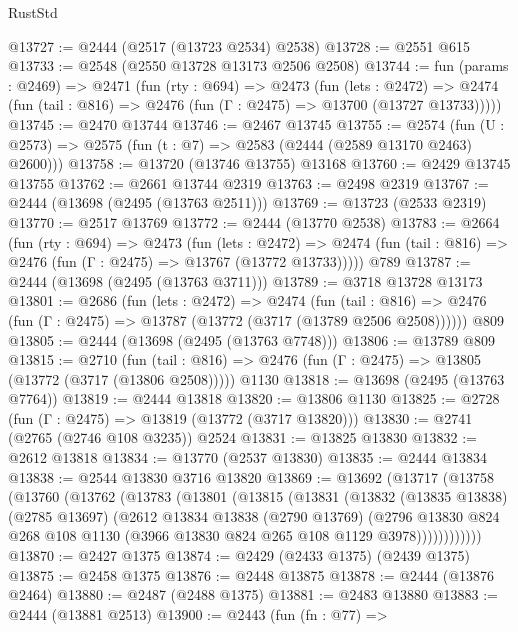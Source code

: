 \begin{lexlean}{RustStd}
\begin{coremodule}
@13727 := @2444 (@2517 (@13723 @2534) @2538)
@13728 := @2551 @615
@13733 := @2548 (@2550 @13728 @13173 @2506 @2508)
@13744 := fun (params : @2469) =>
  @2471
    (fun (rty : @694) =>
    @2473
      (fun (lets : @2472) =>
      @2474 (fun (tail : @816) => @2476 (fun (Γ : @2475) => @13700 (@13727 @13733)))))
@13745 := @2470 @13744
@13746 := @2467 @13745
@13755 := @2574
    (fun (U : @2573) => @2575 (fun (t : @7) => @2583 (@2444 (@2589 @13170 @2463) @2600)))
@13758 := @13720 (@13746 @13755) @13168
@13760 := @2429 @13745 @13755
@13762 := @2661 @13744 @2319
@13763 := @2498 @2319
@13767 := @2444 (@13698 (@2495 (@13763 @2511)))
@13769 := @13723 (@2533 @2319)
@13770 := @2517 @13769
@13772 := @2444 (@13770 @2538)
@13783 := @2664
    (fun (rty : @694) =>
    @2473
      (fun (lets : @2472) =>
      @2474 (fun (tail : @816) => @2476 (fun (Γ : @2475) => @13767 (@13772 @13733)))))
    @789
@13787 := @2444 (@13698 (@2495 (@13763 @3711)))
@13789 := @3718 @13728 @13173
@13801 := @2686
    (fun (lets : @2472) =>
    @2474
      (fun (tail : @816) =>
      @2476 (fun (Γ : @2475) => @13787 (@13772 (@3717 (@13789 @2506 @2508))))))
    @809
@13805 := @2444 (@13698 (@2495 (@13763 @7748)))
@13806 := @13789 @809
@13815 := @2710
    (fun (tail : @816) => @2476 (fun (Γ : @2475) => @13805 (@13772 (@3717 (@13806 @2508)))))
    @1130
@13818 := @13698 (@2495 (@13763 @7764))
@13819 := @2444 @13818
@13820 := @13806 @1130
@13825 := @2728 (fun (Γ : @2475) => @13819 (@13772 (@3717 @13820)))
@13830 := @2741 (@2765 (@2746 @108 @3235)) @2524
@13831 := @13825 @13830
@13832 := @2612 @13818
@13834 := @13770 (@2537 @13830)
@13835 := @2444 @13834
@13838 := @2544 @13830 @3716 @13820
@13869 := @13692
    (@13717
      (@13758
        (@13760
          (@13762
            (@13783
              (@13801
                (@13815
                  (@13831
                    (@13832
                      (@13835 @13838)
                      (@2785 @13697)
                      (@2612
                        @13834
                        @13838
                        (@2790 @13769)
                        (@2796
                          @13830
                          @824
                          @268
                          @108
                          @1130
                          (@3966 @13830 @824 @265 @108 @1129 @3978))))))))))))
@13870 := @2427 @1375
@13874 := @2429 (@2433 @1375) (@2439 @1375)
@13875 := @2458 @1375
@13876 := @2448 @13875
@13878 := @2444 (@13876 @2464)
@13880 := @2487 (@2488 @1375)
@13881 := @2483 @13880
@13883 := @2444 (@13881 @2513)
@13900 := @2443
    (fun (fn : @77) =>

\end{coremodule}
\end{lexlean}
